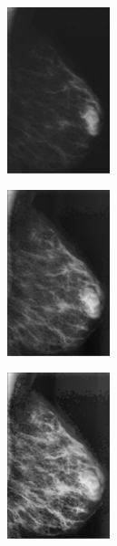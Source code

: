 \documentclass[spanish,twocolumn]{article}
\begin{document}
{\begin{minipage}[b]{1.0\linewidth}
\end{minipage}

\begin{minipage}[b]{1.0\linewidth}
  
   \begin{minipage}[t]{0.3\linewidth}  
   		\centering
        \includegraphics[width=3cm]{Figures/3715982_IJMPO-34-47-g001.png}
  	\end{minipage}
  \hspace{1pt}
   \begin{minipage}[t]{0.3\linewidth}  
   		\centering
        \includegraphics[width=3cm]{Figures/11608-3715982_IJMPO-34-47-g001.png}
  	\end{minipage}
   \begin{minipage}[t]{0.3\linewidth}  
   		\centering
        \includegraphics[width=3cm]{Figures/11806-3715982_IJMPO-34-47-g001.png}
  	\end{minipage}
  \vspace{0.5cm}
    \label{fig:resultado2}


\end{minipage}}
\end{document}
